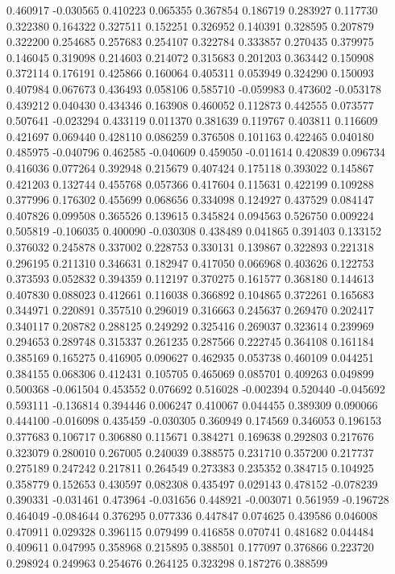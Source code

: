0.460917
-0.030565
0.410223
0.065355
0.367854
0.186719
0.283927
0.117730
0.322380
0.164322
0.327511
0.152251
0.326952
0.140391
0.328595
0.207879
0.322200
0.254685
0.257683
0.254107
0.322784
0.333857
0.270435
0.379975
0.146045
0.319098
0.214603
0.214072
0.315683
0.201203
0.363442
0.150908
0.372114
0.176191
0.425866
0.160064
0.405311
0.053949
0.324290
0.150093
0.407984
0.067673
0.436493
0.058106
0.585710
-0.059983
0.473602
-0.053178
0.439212
0.040430
0.434346
0.163908
0.460052
0.112873
0.442555
0.073577
0.507641
-0.023294
0.433119
0.011370
0.381639
0.119767
0.403811
0.116609
0.421697
0.069440
0.428110
0.086259
0.376508
0.101163
0.422465
0.040180
0.485975
-0.040796
0.462585
-0.040609
0.459050
-0.011614
0.420839
0.096734
0.416036
0.077264
0.392948
0.215679
0.407424
0.175118
0.393022
0.145867
0.421203
0.132744
0.455768
0.057366
0.417604
0.115631
0.422199
0.109288
0.377996
0.176302
0.455699
0.068656
0.334098
0.124927
0.437529
0.084147
0.407826
0.099508
0.365526
0.139615
0.345824
0.094563
0.526750
0.009224
0.505819
-0.106035
0.400090
-0.030308
0.438489
0.041865
0.391403
0.133152
0.376032
0.245878
0.337002
0.228753
0.330131
0.139867
0.322893
0.221318
0.296195
0.211310
0.346631
0.182947
0.417050
0.066968
0.403626
0.122753
0.373593
0.052832
0.394359
0.112197
0.370275
0.161577
0.368180
0.144613
0.407830
0.088023
0.412661
0.116038
0.366892
0.104865
0.372261
0.165683
0.344971
0.220891
0.357510
0.296019
0.316663
0.245637
0.269470
0.202417
0.340117
0.208782
0.288125
0.249292
0.325416
0.269037
0.323614
0.239969
0.294653
0.289748
0.315337
0.261235
0.287566
0.222745
0.364108
0.161184
0.385169
0.165275
0.416905
0.090627
0.462935
0.053738
0.460109
0.044251
0.384155
0.068306
0.412431
0.105705
0.465069
0.085701
0.409263
0.049899
0.500368
-0.061504
0.453552
0.076692
0.516028
-0.002394
0.520440
-0.045692
0.593111
-0.136814
0.394446
0.006247
0.410067
0.044455
0.389309
0.090066
0.444100
-0.016098
0.435459
-0.030305
0.360949
0.174569
0.346053
0.196153
0.377683
0.106717
0.306880
0.115671
0.384271
0.169638
0.292803
0.217676
0.323079
0.280010
0.267005
0.240039
0.388575
0.231710
0.357200
0.217737
0.275189
0.247242
0.217811
0.264549
0.273383
0.235352
0.384715
0.104925
0.358779
0.152653
0.430597
0.082308
0.435497
0.029143
0.478152
-0.078239
0.390331
-0.031461
0.473964
-0.031656
0.448921
-0.003071
0.561959
-0.196728
0.464049
-0.084644
0.376295
0.077336
0.447847
0.074625
0.439586
0.046008
0.470911
0.029328
0.396115
0.079499
0.416858
0.070741
0.481682
0.044484
0.409611
0.047995
0.358968
0.215895
0.388501
0.177097
0.376866
0.223720
0.298924
0.249963
0.254676
0.264125
0.323298
0.187276
0.388599
